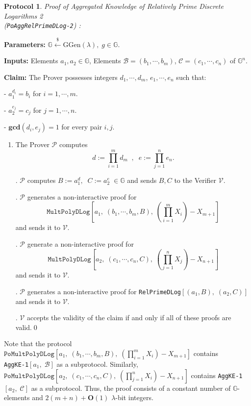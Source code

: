 \documentclass[11pt, lettersize, notitlepage, leqno, footskip=0.6cm]{article}
\newcommand{\pl}{\prod\limits}
\newcommand{\ttt}{\texttt}
\newcommand{\mc}{\mathcal}
\newcommand{\mb}{\mathbb}
\newcommand{\mbf}{\mathbf}
\newcommand{\mr}{\mathrm}
\newcommand{\lam}{\lambda}
\newcommand{\lamb}{\lambda}
\newcommand{\bO}{\mbf{O}}
\newcommand{\vs}{\vspace{-0.15cm}}
\newcommand{\noin}{\noindent}
\newcommand{\GCD}{\mbf{gcd}}
\newtheorem{Prot}[Thm]{Protocol}
\numberwithin{equation}{section}
\begin{document}
\begin{Prot} \normalfont \textit{Proof of Aggregated Knowledge of Relatively Prime Discrete Logarithms 2}\\ (\verb|PoAggRelPrimeDLog-2|) :\end{Prot}\vspace{-0.3cm}

\noindent \textbf{Parameters:} $\mb{G}\xleftarrow{\$} \mr{GGen}(\lamb), \; g\in \mb{G}$.

\noindent \textbf{Inputs:} Elements $a_1, a_2\in \mb{G}$, Elements $\mc{B} = (b_1,\cdots, b_m)$, $\mc{C} = (c_1,\cdots, c_n)$ of $\mb{G}^n$.

\noindent \textbf{Claim:} The Prover possesses integers $d_1,\cdots, d_m$,\; $e_1,\cdots,e_n$ such that:

\noindent - $a_1^{d_i} = b_i$ for $i = 1,\cdots, m$.

\noindent - $a_2^{e_j} = c_j$ for $j = 1,\cdots, n$.

\noindent - $\GCD(d_i, e_j) = 1$ for every pair $i, j$.


\begin{enumerate}[wide, labelwidth=!, labelindent=0pt]\vs \item The Prover $\mc{P}$ computes \vs $${d}:= \pl_{i=1}^m d_m\;\;,\;\; {e}:= \pl_{j=1}^n e_n.$$

. $\mc{P}$ computes $B:= a_1^{d},\;\;C:= a_2^{e}\;\in\mb{G}$ and sends $B, C$ to the Verifier $\mc{V}$.

. $\mc{P}$ generates a non-interactive proof for \vs $$\ttt{MultPolyDLog}[a_1,\;(b_1,\cdots,b_m, B),\; (\pl_{i=1}^m X_i) -X_{m+1}]$$ and sends it to $\mc{V}$.

\noin 4. $\mc{P}$ generate a non-interactive proof for \vs $$ \ttt{MultPolyDLog}[a_2,\;(c_1,\cdots,c_n, C),\; (\pl_{j=1}^n X_j) -X_{n+1}]$$ and sends it to $\mc{V}$.


. $\mc{P}$ generates a non-interactive proof for \verb|RelPrimeDLog|$[(a_1, B),\;(a_2, C)]$ and sends it to $\mc{V}$. 

. $\mc{V}$ accepts the validity of the claim if and only if all of these proofs are valid.\qed \end{enumerate}

Note that the protocol $\ttt{PoMultPolyDLog}[a_1,\;(b_1,\cdots,b_m, B),\; (\pl_{i=1}^m X_i) -X_{m+1}]$ contains\\ \verb|AggKE-1|$[a_1,\;\mc{B}]$ as a subprotocol. Similarly, $\ttt{PoMultPolyDLog}[a_2,\;(c_1,\cdots,c_n, C),\; (\pl_{j=1}^n X_i) -X_{n+1}]$ contains \verb|AggKE-1|$[a_2,\;\mc{C}]$ as a subprotocol. Thus, the proof consists of a constant number of $\mb{G}$-elements and $2(m+n)+\bO(1)$ $\lam$-bit integers.\vspace{0.2cm}
\end{document}
